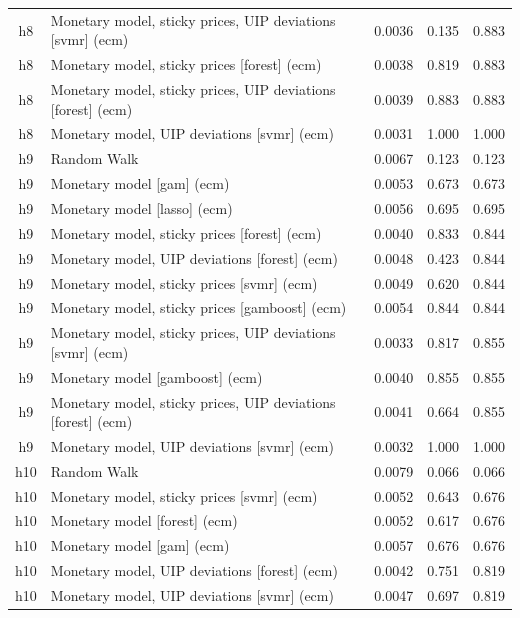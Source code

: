 \begin{ThreePartTable}
\begin{longtable}[t]{cp{5.5cm}ccc}
h8 & \raggedright Monetary model, sticky prices, UIP deviations [svmr] (ecm) & 0.0036 & 0.135 & 0.883\\
h8 & \raggedright Monetary model, sticky prices [forest] (ecm) & 0.0038 & 0.819 & 0.883\\
h8 & \raggedright Monetary model, sticky prices, UIP deviations [forest] (ecm) & 0.0039 & 0.883 & 0.883\\
h8 & \raggedright Monetary model, UIP deviations [svmr] (ecm) & 0.0031 & 1.000 & 1.000\\
\addlinespace
h9 & \raggedright Random Walk & 0.0067 & 0.123 & 0.123\\
h9 & \raggedright Monetary model [gam] (ecm) & 0.0053 & 0.673 & 0.673\\
h9 & \raggedright Monetary model [lasso] (ecm) & 0.0056 & 0.695 & 0.695\\
h9 & \raggedright Monetary model, sticky prices [forest] (ecm) & 0.0040 & 0.833 & 0.844\\
h9 & \raggedright Monetary model, UIP deviations [forest] (ecm) & 0.0048 & 0.423 & 0.844\\
h9 & \raggedright Monetary model, sticky prices [svmr] (ecm) & 0.0049 & 0.620 & 0.844\\
h9 & \raggedright Monetary model, sticky prices [gamboost] (ecm) & 0.0054 & 0.844 & 0.844\\
h9 & \raggedright Monetary model, sticky prices, UIP deviations [svmr] (ecm) & 0.0033 & 0.817 & 0.855\\
h9 & \raggedright Monetary model [gamboost] (ecm) & 0.0040 & 0.855 & 0.855\\
h9 & \raggedright Monetary model, sticky prices, UIP deviations [forest] (ecm) & 0.0041 & 0.664 & 0.855\\
h9 & \raggedright Monetary model, UIP deviations [svmr] (ecm) & 0.0032 & 1.000 & 1.000\\
\addlinespace
h10 & \raggedright Random Walk & 0.0079 & 0.066 & 0.066\\
h10 & \raggedright Monetary model, sticky prices [svmr] (ecm) & 0.0052 & 0.643 & 0.676\\
h10 & \raggedright Monetary model [forest] (ecm) & 0.0052 & 0.617 & 0.676\\
h10 & \raggedright Monetary model [gam] (ecm) & 0.0057 & 0.676 & 0.676\\
h10 & \raggedright Monetary model, UIP deviations [forest] (ecm) & 0.0042 & 0.751 & 0.819\\
h10 & \raggedright Monetary model, UIP deviations [svmr] (ecm) & 0.0047 & 0.697 & 0.819\\

\end{longtable}
\end{ThreePartTable}
